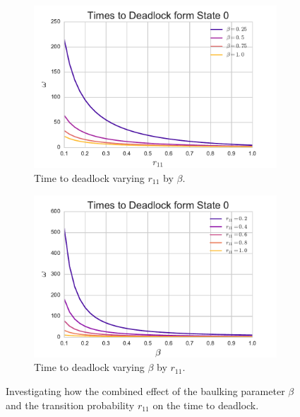 \documentclass{article}
\begin{document}
\begin{figure}[!hbtp]
\begin{center}
\begin{subfigure}[b]{0.45\textwidth}
    \includegraphics[width=\textwidth]{img/varyr11_bybeta.pdf}
    \caption{Time to deadlock varying $r_{11}$ by $\beta$.}
    \label{fig:varyr11bybeta}
\end{subfigure}
\begin{subfigure}[b]{0.45\textwidth}
    \includegraphics[width=\textwidth]{img/varybeta_byr11.pdf}
    \caption{Time to deadlock varying $\beta$ by $r_{11}$.}
    \label{fig:varybetabyr11}
\end{subfigure}
\end{center}
\caption{Investigating how the combined effect of the baulking parameter $\beta$ and the transition probability $r_{11}$ on the time to deadlock.}
\label{fig:combinedeffect_betar11}
\end{figure}
\end{document}
